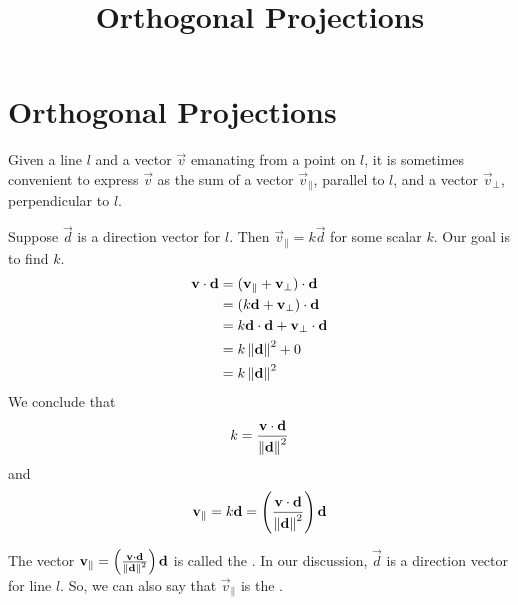 \documentclass{ximera}
\title{Orthogonal Projections} \license{CC BY-NC-SA 4.0}
\begin{document}
\begin{abstract}
 \end{abstract}
\maketitle

\section*{Orthogonal Projections}

Given a line $l$ and a vector $\vec{v}$ emanating from a point on $l$, it is sometimes convenient to express $\vec{v}$ as the sum of a vector $\vec{v}_{\parallel}$, parallel to $l$, and a vector $\vec{v}_{\perp}$, perpendicular to $l$.

\begin{center}

\end{center}

Suppose $\vec{d}$ is a direction vector for $l$.  Then $\vec{v}_
{\parallel}=k\vec{d}$ for some scalar $k$.  Our goal is to find $k$.  
\begin{align*}\mathbf{v}\cdot\mathbf{d}&=(\mathbf{v}_{\parallel}+\mathbf{v}_{\perp})\cdot\mathbf{d}\\
&=(k\mathbf{d}+\mathbf{v}_{\perp})\cdot\mathbf{d}\\
&=k\mathbf{d}\cdot\mathbf{d}+\mathbf{v}_{\perp}\cdot\mathbf{d}\\
&=k\left\lVert\mathbf{d}\right\rVert^2+0\\
&=k\left\lVert\mathbf{d}\right\rVert^2
\end{align*}
We conclude that $$k=\frac{\mathbf{v}\cdot\mathbf{d}}{\left\lVert\mathbf{d}\right\rVert^2}$$
and $$\mathbf{v}_{\parallel}=k\mathbf{d}=\left(\frac{\mathbf{v}\cdot\mathbf{d}}{\left\lVert\mathbf{d}\right\rVert^2}\right)\mathbf{d}$$

The vector $\mathbf{v}_{\parallel}=\left(\frac{\mathbf{v}\cdot\mathbf{d}}{\left\lVert\mathbf{d}\right\rVert^2}\right)\mathbf{d}$ is called the .  In our discussion, $\vec{d}$ is a direction vector for line $l$.  So, we can also say that $\vec{v}_{\parallel}$ is the .
\end{document}
